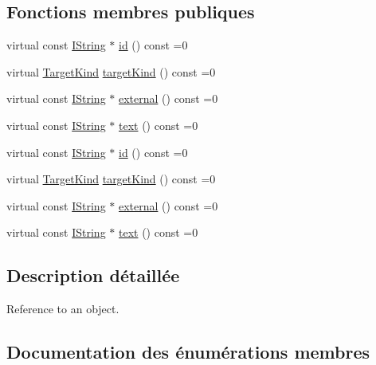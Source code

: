 \subsection*{Fonctions membres publiques}
\begin{DoxyCompactItemize}
\item 
virtual const \hyperlink{class_i_string}{I\+String} $\ast$ \hyperlink{class_i_l_t___ref_a99c5dbcfced8ceecf1898e877cbb90ff}{id} () const  =0
\item 
virtual \hyperlink{class_i_l_t___ref_a76e1fe83459ddebc82bea1930caf674d}{Target\+Kind} \hyperlink{class_i_l_t___ref_ad1f938a2124e700128bfba66497ed357}{target\+Kind} () const  =0
\item 
virtual const \hyperlink{class_i_string}{I\+String} $\ast$ \hyperlink{class_i_l_t___ref_aaa054c3e819eca742b4c89a7d916e52d}{external} () const  =0
\item 
virtual const \hyperlink{class_i_string}{I\+String} $\ast$ \hyperlink{class_i_l_t___ref_ae985a1d9a3fb0a77b09db09ffe481aa1}{text} () const  =0
\item 
virtual const \hyperlink{class_i_string}{I\+String} $\ast$ \hyperlink{class_i_l_t___ref_a99c5dbcfced8ceecf1898e877cbb90ff}{id} () const  =0
\item 
virtual \hyperlink{class_i_l_t___ref_a76e1fe83459ddebc82bea1930caf674d}{Target\+Kind} \hyperlink{class_i_l_t___ref_ad1f938a2124e700128bfba66497ed357}{target\+Kind} () const  =0
\item 
virtual const \hyperlink{class_i_string}{I\+String} $\ast$ \hyperlink{class_i_l_t___ref_aaa054c3e819eca742b4c89a7d916e52d}{external} () const  =0
\item 
virtual const \hyperlink{class_i_string}{I\+String} $\ast$ \hyperlink{class_i_l_t___ref_ae985a1d9a3fb0a77b09db09ffe481aa1}{text} () const  =0
\end{DoxyCompactItemize}


\subsection{Description détaillée}
Reference to an object. 

\subsection{Documentation des énumérations membres}
\hypertarget{class_i_l_t___ref_a76e1fe83459ddebc82bea1930caf674d}{}
